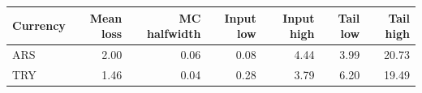 \begin{tabular}{lrrrrrr}
\toprule
Currency & Mean loss & MC halfwidth & Input low & Input high & Tail low & Tail high \\
\midrule
ARS & 2.00 & 0.06 & 0.08 & 4.44 & 3.99 & 20.73 \\
TRY & 1.46 & 0.04 & 0.28 & 3.79 & 6.20 & 19.49 \\
\bottomrule
\end{tabular}
